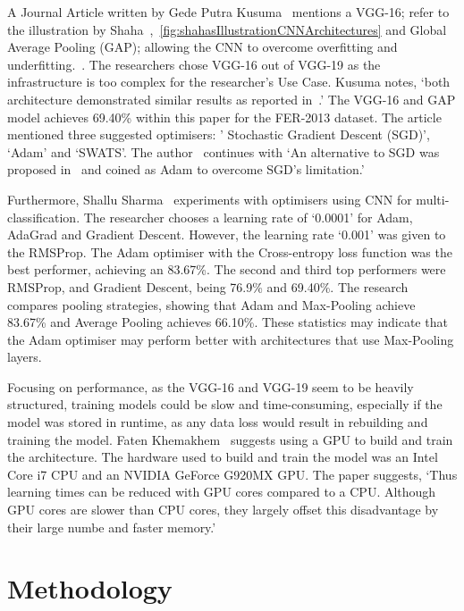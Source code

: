 \documentclass[conference]{IEEEtran}
\begin{document}
      A Journal Article written by Gede Putra Kusuma~\cite{kusuma_emotion_2020} mentions a VGG-16; refer to the illustration by Shaha~\cite{shaha_transfer_2018},~\ref{fig:shahasIllustrationCNNArchitectures} and Global Average Pooling (GAP); allowing the CNN to overcome overfitting and underfitting.~\cite{lin_network_2014}. The researchers chose VGG-16 out of VGG-19 as the infrastructure is too complex for the researcher's Use Case. Kusuma notes, `both architecture demonstrated similar results as reported in~\cite{simonyan_very_2015}.' The VGG-16 and GAP model achieves 69.40\% within this paper for the FER-2013 dataset. The article mentioned three suggested optimisers: ' Stochastic Gradient Descent (SGD)', `Adam' and `SWATS'. The author~\cite{kusuma_emotion_2020} continues with `An alternative to SGD was proposed in~\cite{kingma_adam_2015} and coined as Adam to overcome SGD's limitation.'

      Furthermore, Shallu Sharma~\cite{shaha_transfer_2018} experiments with optimisers using CNN for multi-classification. The researcher chooses a learning rate of `0.0001' for Adam, AdaGrad and Gradient Descent. However, the learning rate `0.001' was given to the RMSProp. The Adam optimiser with the Cross-entropy loss function was the best performer, achieving an 83.67\%. The second and third top performers were RMSProp, and Gradient Descent, being 76.9\% and 69.40\%. The research compares pooling strategies, showing that Adam and Max-Pooling achieve 83.67\% and Average Pooling achieves 66.10\%. These statistics may indicate that the Adam optimiser may perform better with architectures that use Max-Pooling layers.

      Focusing on performance, as the VGG-16 and VGG-19 seem to be heavily structured, training models could be slow and time-consuming, especially if the model was stored in runtime, as any data loss would result in rebuilding and training the model. Faten Khemakhem~\cite{khemakhem_facial_2019} suggests using a GPU to build and train the architecture. The hardware used to build and train the model was an Intel Core i7 CPU and an NVIDIA GeForce G920MX GPU. The paper suggests, `Thus learning times can be reduced with GPU cores compared to a CPU. Although GPU cores are slower than CPU cores, they largely offset this disadvantage by their large numbe and faster memory.'~\cite{khemakhem_facial_2019}

    \section{Methodology}
\end{document}

